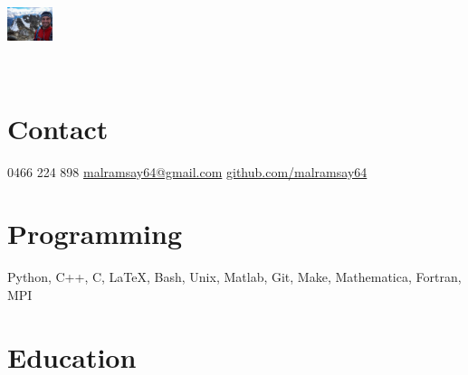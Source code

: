\documentclass[print]{friggeri-cv} %
\begin{document}


\begin{aside} %
    \vspace{30 mm}~
\begin{flushleft}\includegraphics[width=3.6em]{portrait}\\\end{flushleft}~
\section{Contact}
0466 224 898
\href{mailto:malramsay64@gmail.com}{malramsay64@gmail.com}
\href{github.com/malramsay64}{github.com/malramsay64}
\section{Programming}
Python, C++, C, \LaTeX,
Bash, Unix, Matlab, Git, 
Make, Mathematica, 
Fortran, MPI
\end{aside}


\section{Education}
\end{document}
